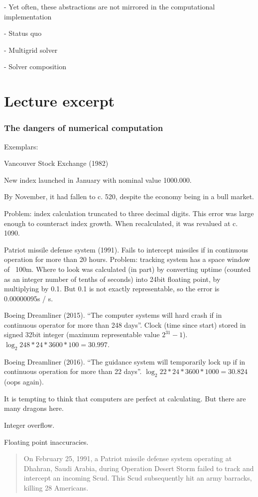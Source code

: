 \documentclass[presentation]{beamer}
\begin{document}
- Yet often, these abstractions are not mirrored in the computational
implementation

- Status quo

- Multigrid solver

- Solver composition


\section{Lecture excerpt}

\begin{frame}[fragile]
  \frametitle{The dangers of numerical computation}

  Exemplars:

  Vancouver Stock Exchange (1982)

  New index launched in January with nominal value 1000.000.

  By November, it had fallen to c. 520, despite the economy being
  in a bull market.

  Problem: index calculation truncated to three decimal digits.  This
  error was large enough to counteract index growth.  When
  recalculated, it was revalued at c. 1090.


  Patriot missile defense system (1991).  Fails to intercept missiles if in
  continuous operation for more than 20 hours.  Problem: tracking
  system has a space window of ~100m.  Where to look was calculated
  (in part) by converting uptime (counted as an integer number of
  tenths of seconds) into 24bit floating point, by multiplying by
  0.1.  But  0.1 is not exactly representable, so the error is
  0.00000095s / s.

  Boeing Dreamliner (2015).  ``The computer systems will hard crash if
  in continuous operator for more than 248 days''.  Clock (time since
  start) stored in signed 32bit integer (maximum representable value
  $2^31 - 1$).  $\log_2 248 * 24 * 3600 * 100 = 30.997$.

  Boeing Dreamliner (2016).  ``The guidance system will temporarily
  lock up if in continuous operation for more than 22 days''.  $\log_2
  22 * 24 * 3600 * 1000 = 30.824$ (oops again).

  It is tempting to think that computers are perfect at calculating.
  But there are many dragons here.

  Integer overflow.

  Floating point inaccuracies.
  
  
  \begin{quote}
    On February 25, 1991, a Patriot missile defense system operating
    at Dhahran, Saudi Arabia, during Operation Desert Storm failed to
    track and intercept an incoming Scud. This Scud subsequently hit
    an army barracks, killing 28 Americans.
  \end{quote}


\end{frame}
\end{document}
